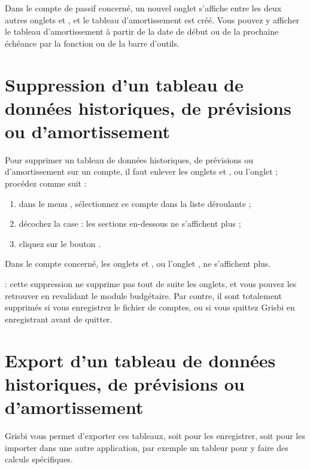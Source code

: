 Dans le compte de passif concerné, un nouvel onglet  s'affiche entre les deux autres onglets  et , et le tableau d'amortissement est créé. Vous pouvez y afficher le tableau d'amortissement à partir de la date de début ou de la prochaine échéance par la fonction  ou  de la barre d'outils.


\section{Suppression d'un tableau de données historiques, de prévisions ou d'amortissement\label{budget-remove}}


Pour supprimer un tableau de données historiques, de prévisions ou d'amortissement sur un compte, il faut enlever les onglets  et , ou l'onglet  ; procédez comme suit :


\begin{enumerate}
	\item dans le menu , sélectionnez ce compte dans la liste déroulante ;
	\item décochez la case  : les sections en-dessous ne s'affichent plus ;
	\item cliquez sur le bouton .	
\end{enumerate}

Dans le compte concerné, les onglets  et , ou l'onglet , ne s'affichent plus.

 : cette suppression ne supprime pas tout de suite les onglets, et vous pouvez les retrouver en revalidant le module budgétaire. Par contre, il sont totalement supprimés si vous enregistrez le fichier de comptes, ou si vous quittez Grisbi en enregistrant avant de quitter.


\section{Export d'un tableau de données historiques, de prévisions ou d'amortissement\label{budget-export}}


Grisbi vous permet d'exporter ces tableaux, soit pour les enregistrer, soit pour les importer dans une autre application, par exemple un tableur pour y faire des calculs spécifiques. 

